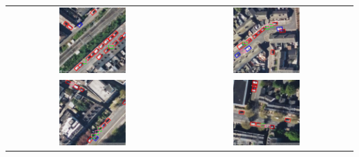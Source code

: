 \begin{table}[htbp]
    \centering
    \begin{tabular}{cc}
        \includegraphics[width=0.4\textwidth]{images/image1_empty_parking_detection_test_set.png} & \includegraphics[width=0.4\textwidth]{images/image2_empty_parking_detection_test_set.png} \\
        \includegraphics[width=0.4\textwidth]{images/image3_empty_parking_detection_test_set.png} & \includegraphics[width=0.4\textwidth]{images/image4_empty_parking_detection_test_set.png} \\

\end{tabular}
\end{table}
